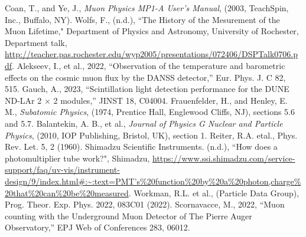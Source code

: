 \documentclass[11pt,letterpaper]{article}
\begin{document}
\begin{thebibliography}{99}
 Coan, T., and Ye, J., \textit{Muon Physics MP1-A User’s Manual}, (2003, TeachSpin, Inc., Buffalo, NY).
 Wolfs, F., (n.d.), ``The History of the Mesurement of the Muon Lifetime," Department of Physics and Astronomy, University of Rochester, Department talk, \url{http://teacher.pas.rochester.edu/wyp2005/presentations/072406/DSPTalk0706.pdf}.
 Alekseev, I., et al., 2022, “Observation of the temperature and barometric effects on the cosmic muon flux by the DANSS detector,” Eur. Phys. J. C 82, 515.
 Gauch, A., 2023, “Scintillation light detection performance for the DUNE ND-LAr 2 × 2 modules,” JINST 18, C04004.
 Frauenfelder, H., and Henley, E. M., \textit{Subatomic Physics}, (1974, Prentice Hall, Englewood Cliffs, NJ), sections 5.6 and 5.7.
 Balantekin, A. B., et al., \textit{Journal of Physics G Nuclear and Particle Physics}, (2010, IOP Publishing, Bristol, UK), section 1.
 Reiter, R.A. etal., Phys. Rev. Let. 5, 2 (1960).
 Shimadzu Scientific Instruments. (n.d.), ``How does a photomultiplier tube work?", Shimadzu, \url{https://www.ssi.shimadzu.com/service-support/faq/uv-vis/instrument-design/9/index.html#:~:text=PMT’s%20function%20by%20a%20photon,charge%20that%20can%20be%20measured}. 
 Workman, R.L. et al., (Particle Data Group), Prog. Theor. Exp. Phys. 2022, 083C01 (2022).
 Scornavacce, M., 2022, “Muon counting with the Underground Muon Detector of The Pierre Auger Observatory,” EPJ Web of Conferences 283, 06012.


\end{thebibliography}
\end{document}
